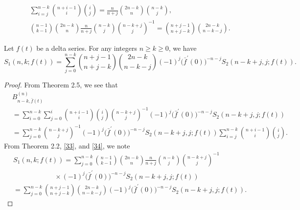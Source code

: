 \documentclass[10pt,a4paper]{amsart}
\begin{document}
\begin{equation} \label{33}
\begin{aligned}
&\sum_{i=j}^{n-k}\binom{n+i-1}{i}\binom{i}{j}=\frac{n}{n+j}\binom{2n-k}{n}\binom{n-k}{j}, \\
&\binom{n-1}{k-1}\binom{2n-k}{n}\frac{n}{n+j}\binom{n-k}{j}\binom{n-k+j}{j}^{-1}=\binom{n+j-1}{n+j-k}\binom{2n-k}{n-k-j}.
\end{aligned}
\end{equation}

\begin{theorem}
Let $f(t)$ be a delta series. For any integers $n \ge k \ge 0$, we have
\begin{equation*}
S_{1}(n,k; f(t))=\sum_{j=0}^{n-k}\binom{n+j-1}{n+j-k}\binom{2n-k}{n-k-j}(-1)^{j}\big(\bar{f}^{\prime}(0)\big)^{-n-j}S_{2}(n-k+j,j; f(t)).
\end{equation*}
\end{theorem}

\begin{proof}
From Theorem 2.5, we see that 
\begin{equation} \label{34}
\begin{aligned}
&B_{n-k,\bar{f}(t)}^{(n)}\\
&=\sum_{i=0}^{n-k}\sum_{j=0}^{i}\binom{n+i-1}{i}\binom{i}{j}\binom{n-k+j}{j}^{-1}(-1)^{j}\big(\bar{f}^{\prime}(0)\big)^{-n-j}S_{2}(n-k+j,j; f(t)) \\
&=\sum_{j=0}^{n-k}\binom{n-k+j}{j}^{-1}(-1)^{j}\big(\bar{f}^{\prime}(0)\big)^{-n-j}S_{2}(n-k+j,j; f(t))\sum_{i=j}^{n-k}\binom{n+i-1}{i}\binom{i}{j}.
\end{aligned}
\end{equation}
From Theorem 2.2, \eqref{33}, and \eqref{34}, we note
\begin{align*}
&S_{1}(n,k; f(t))=\sum_{j=0}^{n-k}\binom{n-1}{k-1}\binom{2n-k}{n}\frac{n}{n+j}\binom{n-k}{j}\binom{n-k+j}{j}^{-1}\\
&\quad\quad\quad\quad\quad\quad \times (-1)^{j}\big(\bar{f}^{\prime}(0)\big)^{-n-j}S_{2}(n-k+j,j; f(t)) \\
&=\sum_{j=0}^{n-k} \binom{n+j-1}{n+j-k}\binom{2n-k}{n-k-j}(-1)^{j}\big(\bar{f}^{\prime}(0)\big)^{-n-j}S_{2}(n-k+j,j; f(t)).
\end{align*}
\end{proof}
\end{document}
